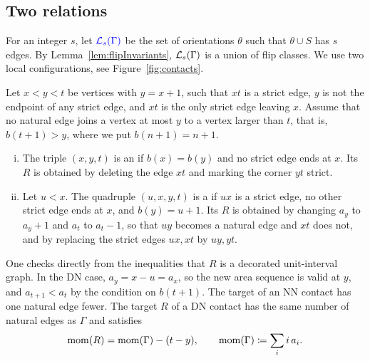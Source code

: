 \subsection{Two relations}

For an integer $s$, let $\defin{\Lay_s(\Gamma)}$ be the set of orientations
$\theta$ such that $\theta\cup S$ has $s$ edges.
By Lemma~\ref{lem:flipInvariants}, $\mathcal{L}_s(\Gamma)$ is a union of flip
classes.
We use two local configurations, see Figure~\ref{fig:contacts}.

\begin{definition}\label{def:contacts}
Let $x<y<t$ be vertices with $y=x+1$, such that $xt$ is a strict edge, $y$ is not
the endpoint of any strict edge, and $xt$ is the only strict edge leaving $x$.
Assume that no natural edge joins a vertex at most $y$ to a vertex larger than
$t$, that is, $b(t+1)>y$, where we put $b(n+1)=n+1$.
\begin{enumerate}[(i)]
\item The triple $(x,y,t)$ is an  if $b(x)=b(y)$ and no strict
edge ends at $x$.
Its  $R$ is obtained by deleting the edge $xt$ and marking the
corner $yt$ strict.
\item Let $u<x$. The quadruple $(u,x,y,t)$ is a  if $ux$ is a
strict edge, no other strict edge ends at $x$, and $b(y)=u+1$.
Its  $R$ is obtained by changing $a_y$ to $a_y+1$ and $a_t$ to
$a_t-1$, so that $uy$ becomes a natural edge and $xt$ does not, and by replacing
the strict edges $ux,xt$ by $uy,yt$.
\end{enumerate}
\end{definition}

One checks directly from the inequalities that $R$ is a decorated
unit-interval graph.
In the DN case, $a_y=x-u=a_x$, so the new area sequence is valid at $y$, and
$a_{t+1}<a_t$ by the condition on $b(t+1)$.
The target of an NN contact has one natural edge fewer.
The target $R$ of a DN contact has the same number of natural edges as $\Gamma$
and satisfies
\[
 \operatorname{mom}(R)=\operatorname{mom}(\Gamma)-(t-y),
 \qquad \operatorname{mom}(\Gamma)\coloneqq\sum_i i\,a_i.
\]

